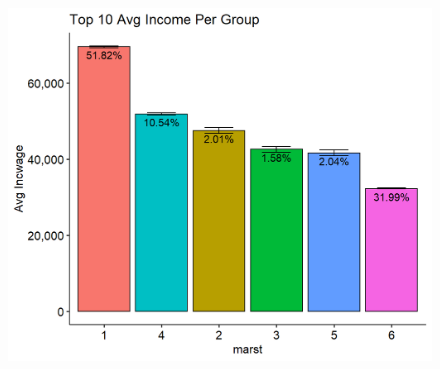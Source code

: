 \documentclass[11pt, letter,twocolumn]{article}
\begin{document}
\begin{figure}[ht]
	\centering
	\label{fig:unnamed-chunk-7-4}
	\includegraphics[width=0.9\linewidth]{imgs/preliminary_analysis/unnamed-chunk-7-4}
\end{figure}
\end{document}
